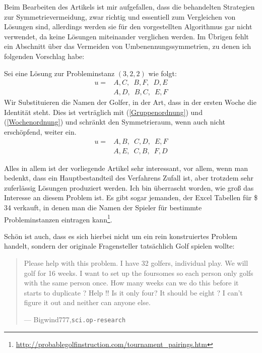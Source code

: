 Beim Bearbeiten des Artikels ist mir aufgefallen, dass die behandelten Strategien zur Symmetrievermeidung, zwar richtig und essentiell zum Vergleichen von Lösungen sind, 
allerdings werden sie für den vorgestellten Algorithmus gar nicht verwendet, da keine Lösungen miteinander verglichen werden. 
Im Übrigen fehlt ein Abschnitt über das Vermeiden von Umbenennungssymmetrien, zu denen ich folgenden Vorschlag habe:

Sei eine Lösung zur Probleminstanz $(3,2,2)$ wie folgt:
\begin{equation}
\begin{split} 
  u =& A, C,\enspace B, F,\enspace D, E \\
    &  A, D, \enspace B, C, \enspace E, F
\end{split}
\end{equation}
Wir Substituieren die Namen der Golfer, in der Art, dass in der ersten Woche die Identität steht. 
Dies ist verträglich mit (\ref{Gruppenordnung}) und (\ref{Wochenordnung}) und schränkt den Symmetrieraum, wenn auch nicht erschöpfend, weiter ein.
\begin{equation}
\begin{split} 
  u =& A, B,\enspace C, D,\enspace E, F \\
    &  A, E, \enspace C, B, \enspace F, D
\end{split}
\end{equation}

Alles in allem ist der vorliegende Artikel sehr interessant, vor allem, wenn man bedenkt, dass ein Hauptbestandteil des Verfahrens Zufall ist, aber trotzdem sehr zuferlässig Lösungen produziert werden.
Ich bin überrascht worden, wie groß das Interesse an diesem Problem ist. 
Es gibt sogar jemanden, der Excel Tabellen für \$ 34 verkauft, in denen man die Namen der Spieler für bestimmte Probleminstanzen eintragen kann\footnote{\url{http://probablegolfinstruction.com/tournament_pairings.htm}}.

Schön ist auch, dass es sich hierbei nicht um ein rein konstruiertes Problem handelt, sondern der originale Fragensteller tatsächlich Golf spielen wollte:
\begin{quote}
Please help with this problem.
I have 32 golfers, individual play.
We will golf for 16 weeks.
I want to set up the foursomes so each person only golfs
with the same person once.
How many weeks can we do this before it starts to duplicate ?
Help !!
Is it only four?
It should be eight ?
I can't figure it out and neither can anyone else.
\par\raggedleft--- \textup{Bigwind777},\quad \texttt{sci.op-research}
\end{quote}
